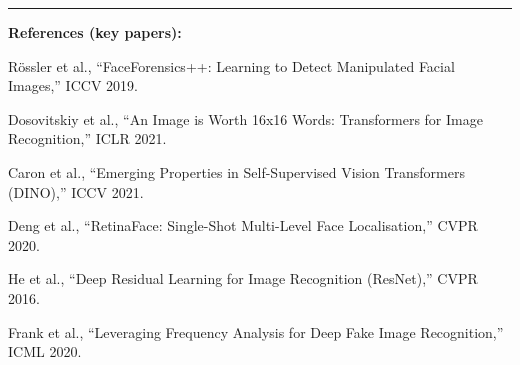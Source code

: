 \documentclass[12pt,a4paper]{article}
\begin{document}
\vspace{1em}
\hrule
\vspace{0.5em}
{\small\color{darkgray}
\textbf{References (key papers):}
\begin{enumerate}[leftmargin=2em, label={[\arabic*]}]
  \item R\"{o}ssler et al., ``FaceForensics++: Learning to Detect Manipulated Facial Images,'' ICCV 2019.
  \item Dosovitskiy et al., ``An Image is Worth 16x16 Words: Transformers for Image Recognition,'' ICLR 2021.
  \item Caron et al., ``Emerging Properties in Self-Supervised Vision Transformers (DINO),'' ICCV 2021.
  \item Deng et al., ``RetinaFace: Single-Shot Multi-Level Face Localisation,'' CVPR 2020.
  \item He et al., ``Deep Residual Learning for Image Recognition (ResNet),'' CVPR 2016.
  \item Frank et al., ``Leveraging Frequency Analysis for Deep Fake Image Recognition,'' ICML 2020.
\end{enumerate}
}
\end{document}
